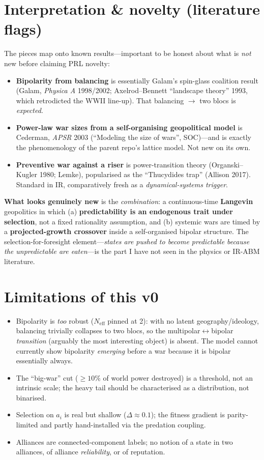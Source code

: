 \documentclass[11pt]{article}
\newcommand{\Neff}{N_{\mathrm{eff}}}
\begin{document}
\section{Interpretation \& novelty (literature flags)}

The pieces map onto known results---important to be honest about what is
\emph{not} new before claiming PRL novelty:
\begin{itemize}
\item \textbf{Bipolarity from balancing} is essentially Galam's spin-glass
  coalition result (Galam, \emph{Physica A} 1998/2002; Axelrod--Bennett
  ``landscape theory'' 1993, which retrodicted the WWII line-up). That balancing
  $\to$ two blocs is \emph{expected}.
\item \textbf{Power-law war sizes from a self-organising geopolitical model} is
  Cederman, \emph{APSR} 2003 (``Modeling the size of wars'', SOC)---and is
  exactly the phenomenology of the parent repo's lattice model. Not new on its
  own.
\item \textbf{Preventive war against a riser} is power-transition theory
  (Organski--Kugler 1980; Lemke), popularised as the ``Thucydides trap''
  (Allison 2017). Standard in IR, comparatively fresh as a
  \emph{dynamical-systems trigger}.
\end{itemize}

\noindent\textbf{What looks genuinely new} is the \emph{combination}: a
continuous-time \textbf{Langevin} geopolitics in which (a) \textbf{predictability
is an endogenous trait under selection}, not a fixed rationality assumption, and
(b) systemic wars are timed by a \textbf{projected-growth crossover} inside a
self-organised bipolar structure. The selection-for-foresight element---\emph{states
are pushed to become predictable because the unpredictable are eaten}---is the
part I have not seen in the physics or IR-ABM literature.

\section{Limitations of this v0}
\begin{itemize}
\item Bipolarity is \emph{too} robust ($\Neff$ pinned at 2): with no latent
  geography/ideology, balancing trivially collapses to two blocs, so the
  multipolar$\leftrightarrow$bipolar \emph{transition} (arguably the most
  interesting object) is absent. The model cannot currently show bipolarity
  \emph{emerging} before a war because it is bipolar essentially always.
\item The ``big-war'' cut ($\ge 10\%$ of world power destroyed) is a threshold,
  not an intrinsic scale; the heavy tail should be characterised as a
  distribution, not binarised.
\item Selection on $a_i$ is real but shallow ($\Delta\approx0.1$); the fitness
  gradient is parity-limited and partly hand-installed via the predation
  coupling.
\item Alliances are connected-component labels; no notion of a state in two
  alliances, of alliance \emph{reliability}, or of reputation.
\end{itemize}
\end{document}
